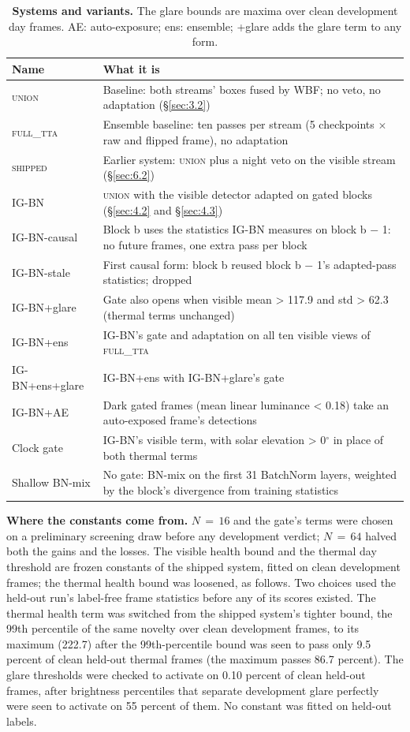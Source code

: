 \documentclass[10pt]{article}
\begin{document}
\begin{table}[htbp]
\centering
\footnotesize
\caption{\textbf{Systems and variants.} The glare bounds are maxima over clean development day frames. AE: auto-exposure; ens: ensemble; +glare adds the glare term to any form.}
\label{tab:22}
\begin{tabularx}{\linewidth}{l>{\raggedright\arraybackslash}X}
\toprule
Name & What it is \\
\midrule
\textsc{union} & Baseline: both streams' boxes fused by WBF; no veto, no adaptation (\S\ref{sec:3.2}) \\
\textsc{full\_tta} & Ensemble baseline: ten passes per stream (5 checkpoints $\times$ raw and flipped frame), no adaptation \\
\textsc{shipped} & Earlier system: \textsc{union} plus a night veto on the visible stream (\S\ref{sec:6.2}) \\
IG-BN & \textsc{union} with the visible detector adapted on gated blocks (\S\ref{sec:4.2} and \S\ref{sec:4.3}) \\
IG-BN-causal & Block b uses the statistics IG-BN measures on block b $-$ 1: no future frames, one extra pass per block \\
IG-BN-stale & First causal form: block b reused block b $-$ 1's adapted-pass statistics; dropped \\
IG-BN+glare & Gate also opens when visible mean > 117.9 and std > 62.3 (thermal terms unchanged) \\
IG-BN+ens & IG-BN's gate and adaptation on all ten visible views of \textsc{full\_tta} \\
IG-BN+ens+glare & IG-BN+ens with IG-BN+glare's gate \\
IG-BN+AE & Dark gated frames (mean linear luminance < 0.18) take an auto-exposed frame's detections \\
Clock gate & IG-BN's visible term, with solar elevation > 0$^{\circ}$ in place of both thermal terms \\
Shallow BN-mix & No gate: BN-mix on the first 31 BatchNorm layers, weighted by the block's divergence from training statistics \\
\bottomrule
\end{tabularx}
\end{table}
\textbf{Where the constants come from.} $N\,{=}\,16$ and the gate's terms were chosen on a preliminary screening draw before any development verdict; $N\,{=}\,64$ halved both the gains and the losses. The visible health bound and the thermal day threshold are frozen constants of the shipped system, fitted on clean development frames; the thermal health bound was loosened, as follows. Two choices used the held-out run's label-free frame statistics before any of its scores existed. The thermal health term was switched from the shipped system's tighter bound, the 99th percentile of the same novelty over clean development frames, to its maximum (222.7) after the 99th-percentile bound was seen to pass only 9.5 percent of clean held-out thermal frames (the maximum passes 86.7 percent). The glare thresholds were checked to activate on 0.10 percent of clean held-out frames, after brightness percentiles that separate development glare perfectly were seen to activate on 55 percent of them. No constant was fitted on held-out labels.
\end{document}
